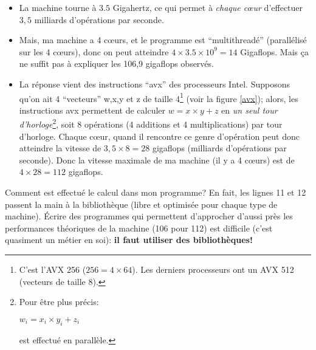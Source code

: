 \begin{itemize}
  \item La machine tourne à $3.5$ Gigahertz, ce qui permet à
    \emph{chaque c{\oe}ur} d'effectuer $3,5$ milliards d'opérations par
    seconde.
  \item Mais, ma machine a 4 c{\oe}urs, et le programme est
    ``multithreadé'' (parallélisé sur les 4 c{\oe}urs), donc on peut
    atteindre $4 \times 
    3.5\times 10^9  = 14 $ Gigaflops. Mais ça ne suffit pas à expliquer les 106,9
    gigaflops observés.
  \item La réponse vient des instructions ``avx'' des processeurs
    Intel.
    Supposons qu'on ait 4 ``vecteurs'' w,x,y et z de taille
    4\footnote{C'est l'AVX 256 ($256 = 4 \times 64$). Les derniers
      processeurs ont un AVX 512 (vecteurs de taille 8).} (voir la
    figure \ref{avx});
    alors, les instructions avx permettent de calculer $w= x \times y + z$ en
    \emph{un seul tour d'horloge}\footnote{Pour être plus précis:
      
      $w_i = x_i \times y_i + z_i$

      est effectué en  parallèle.}, soit 8 opérations (4 additions et 4
    multiplications) par tour d'horloge. Chaque c{\oe}ur, quand il
    rencontre ce genre d'opération peut donc atteindre la vitesse de
    $3,5 \times 8 = 28$ gigaflops (milliards d'opérations par seconde).
    Donc la vitesse maximale de ma machine (il y a 4 c{\oe}urs) est de
    $4 \times 28 = 112$ gigaflops.
\end{itemize}

Comment est effectué le calcul dans mon programme? En fait, les lignes
11 et 12 passent la main à la bibliothèque  (libre et
optimisée pour chaque type de machine). Écrire des programmes qui
permettent d'approcher d'aussi près les
performances théoriques de la machine (106 pour 112) est difficile
(c'est quasiment 
un métier en soi): \textbf{il faut utiliser des bibliothèques!}\medskip



